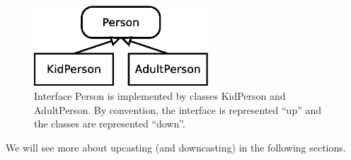 \begin{figure}[hbtp]
  \centering
  \includegraphics[height=3cm]{gfx/class_diagram-person}
  \caption{Interface Person is implemented by classes KidPerson and
    AdultPerson. By convention, the interface is represented ``up'' and
    the classes are represented ``down''.} 
  \label{fig:updown}
\end{figure}

We will see more about upcasting (and downcasting) in the following
sections. 



